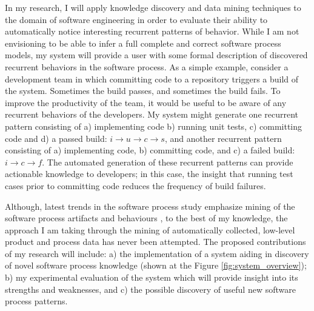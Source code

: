 In my research, I will apply knowledge discovery and data mining techniques to the domain of software engineering in order to evaluate their ability to automatically notice interesting recurrent patterns of behavior. While I am not envisioning to be able to infer a full complete and correct software process models, my system will provide a user with some formal description of discovered recurrent behaviors in the software process. As a simple example, consider a development team in which committing code to a repository triggers a build of the system. Sometimes the build passes, and sometimes the build fails. To improve the productivity of the team, it would be useful to be aware of any recurrent behaviors of the developers. My system might generate one recurrent pattern consisting of a) implementing code b) running unit tests, c) committing code and d) a passed build: $i \rightarrow u \rightarrow c \rightarrow s $, and another recurrent pattern consisting of a) implementing code, b) committing code, and c) a failed build: $i \rightarrow c \rightarrow f $. The automated generation of these recurrent patterns can provide actionable knowledge to developers; in this case, the insight that running test cases prior to committing code reduces the frequency of build failures.

Although, latest trends in the software process study emphasize mining of the software process artifacts and behaviours \cite{citeulike:5043664} \cite{citeulike:1885717} \cite{citeulike:5112229} \cite{citeulike:1885717}, to the best of my knowledge, the approach I am taking through the mining of 
automatically collected, low-level product and process data has never been attempted. The proposed contributions of my research will include: a) the implementation of a system aiding in discovery of novel software process knowledge (shown at the Figure \ref{fig:system_overview}); b) my experimental evaluation of the system which will provide insight into its strengths and weaknesses, and c) the possible discovery of useful new software process patterns.
